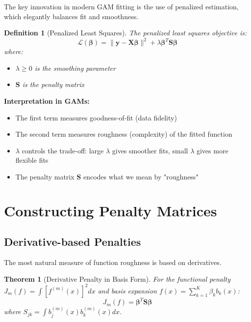 \documentclass[12pt]{article}
\newtheorem{theorem}{Theorem}
\newtheorem{definition}{Definition}
\begin{document}
The key innovation in modern GAM fitting is the use of penalized estimation, which elegantly balances fit and smoothness.

\begin{definition}[Penalized Least Squares]
The penalized least squares objective is:
\begin{equation}
\mathcal{L}(\bm{\beta}) = \|\mathbf{y} - \mathbf{X}\bm{\beta}\|^2 + \lambda \bm{\beta}^T \mathbf{S} \bm{\beta}
\end{equation}
where:
\begin{itemize}
    \item $\lambda \geq 0$ is the smoothing parameter
    \item $\mathbf{S}$ is the penalty matrix
\end{itemize}
\end{definition}

\textbf{Interpretation in GAMs:}
\begin{itemize}
    \item The first term measures goodness-of-fit (data fidelity)
    \item The second term measures roughness (complexity) of the fitted function
    \item $\lambda$ controls the trade-off: large $\lambda$ gives smoother fits, small $\lambda$ gives more flexible fits
    \item The penalty matrix $\mathbf{S}$ encodes what we mean by "roughness"
\end{itemize}

\section{Constructing Penalty Matrices}

\subsection{Derivative-based Penalties}

The most natural measure of function roughness is based on derivatives.

\begin{theorem}[Derivative Penalty in Basis Form]
For the functional penalty $J_m(f) = \int [f^{(m)}(x)]^2 dx$ and basis expansion $f(x) = \sum_{k=1}^K \beta_k b_k(x)$:
\begin{equation}
J_m(f) = \bm{\beta}^T \mathbf{S} \bm{\beta}
\end{equation}
where $S_{jk} = \int b_j^{(m)}(x) b_k^{(m)}(x) dx$.
\end{theorem}
\end{document}
